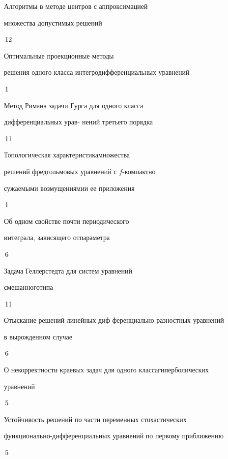 

{Алгоритмы в методе центров с аппроксимацией\newline


множества допустимых решений}{\No\,12}




{Оптимальные проекционные методы\newline


решения одного класса интегродифференциальных уравнений}{\No\,1}




{Метод Римана задачи Гурса для одного класса


дифференциальных урав- \newline нений третьего порядка}{\No\,11}




{Топологическая характеристика\newline множества


решений фредгольмовых уравнений с $f$-компактно 


сужаемыми возмущениями\newline и ее приложения}{\No\,1}




{Об одном свойстве почти периодического


интеграла, зависящего от\newline параметра}{\No\,6}




{Задача Геллерстедта для систем уравнений


смешанного\newline типа}{\No\,11}




{Отыскание решений линейных диф-\newline ференциально-разностных уравнений 


в вырожденном случае}{\No\,6}




{О некорректности краевых задач для одного класса\newline гиперболических


уравнений}{\No\,5}




{Устойчивость решений по части переменных стохастических \newline


функционально-дифференциальных уравнений по первому приближению}{\No\,5}


